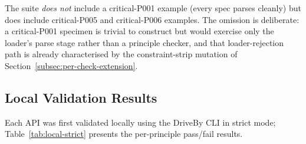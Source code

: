 The suite \emph{does not} include a critical-P001 example (every spec parses cleanly) but does include critical-P005 and critical-P006 examples. The omission is deliberate: a critical-P001 specimen is trivial to construct but would exercise only the loader's parse stage rather than a principle checker, and that loader-rejection path is already characterised by the constraint-strip mutation of Section~\ref{subsec:per-check-extension}.

\subsection{Local Validation Results}
\label{subsec:local-results}

Each API was first validated locally using the DriveBy CLI in strict mode; Table~\ref{tab:local-strict} presents the per-principle pass/fail results.

\begin{table}[htbp]
\centering
\caption{Local validation results in strict mode (6 principles). \cmark{} = pass, \xmark{} = fail. Severity: \textbf{C} = critical, \textbf{W} = warning. Critical-failure counts reflect the severity assignment in which P001--P005 are all critical (Section~\ref{sec:severity-and-gate}).}
\label{tab:local-strict}
\small
{}
\end{table}

